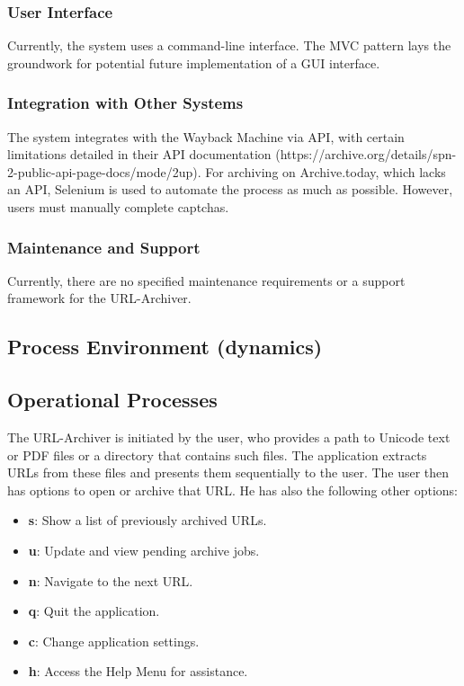 \subsubsection{User Interface}
Currently, the system uses a command-line interface. The MVC pattern lays the groundwork for potential future implementation of a GUI interface.

\subsubsection{Integration with Other Systems}
The system integrates with the Wayback Machine via API, with certain limitations detailed in their API documentation (https://archive.org/details/spn-2-public-api-page-docs/mode/2up). For archiving on Archive.today, which lacks an API, Selenium is used to automate the process as much as possible. However, users must manually complete captchas.

\subsubsection{Maintenance and Support}
Currently, there are no specified maintenance requirements or a support framework for the URL-Archiver.


\subsection{Process Environment (dynamics)}


\subsection{Operational Processes}
The URL-Archiver is initiated by the user, who provides a path to Unicode text or PDF files or a directory that contains such files. The application extracts URLs from these files and presents them sequentially to the user. The user then has options to open or archive that URL. He has also the following other options: 
\begin{itemize}
	\item \textbf{s}: Show a list of previously archived URLs.
	\item \textbf{u}: Update and view pending archive jobs.
	\item \textbf{n}: Navigate to the next URL.
	\item \textbf{q}: Quit the application.
	\item \textbf{c}: Change application settings.
	\item \textbf{h}: Access the Help Menu for assistance.
\end{itemize}

